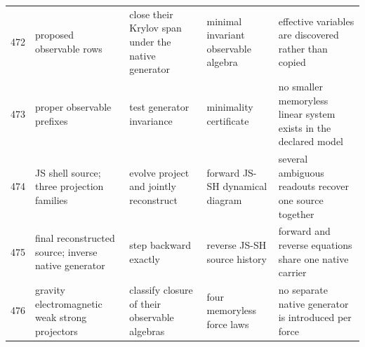 \documentclass[11pt]{article}
\numberwithin{equation}{section}
\theoremstyle{remark}
\begin{document}
\begin{landscape}
\begin{longtable}{p{0.65cm}p{3.5cm}p{4.0cm}p{4.0cm}p{4.6cm}}
472&proposed observable rows&close their Krylov span under the native generator&minimal invariant observable algebra&effective variables are discovered rather than copied\\
473&proper observable prefixes&test generator invariance&minimality certificate&no smaller memoryless linear system exists in the declared model\\
474&JS shell source; three projection families&evolve project and jointly reconstruct&forward JS-SH dynamical diagram&several ambiguous readouts recover one source together\\
475&final reconstructed source; inverse native generator&step backward exactly&reverse JS-SH source history&forward and reverse equations share one native carrier\\
476&gravity electromagnetic weak strong projectors&classify closure of their observable algebras&four memoryless force laws&no separate native generator is introduced per force\\
\bottomrule\end{longtable}

\end{landscape}
\end{document}
